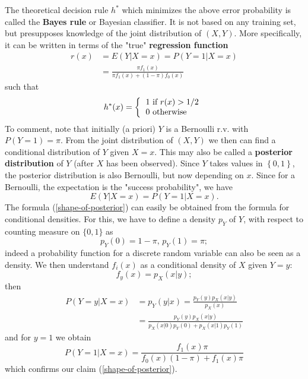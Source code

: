 \documentclass[11pt,twoside]{article}%
\theoremstyle{change}
\begin{document}
The theoretical decision rule $h^{\ast}$ which minimizes the above error
probability is called the \textbf{Bayes rule} or Bayesian classifier. It is
not based on any training set, but presupposes knowledge of the joint
distribution of $\left(  X,Y\right)  $. More specifically, it can be written
in terms of the "true" \textbf{regression function}
\begin{align}
r(x)  & =E\left(  Y|X=x\right)  =P\left(  Y=1|X=x\right) \\
& =\frac{\pi f_{1}(x)}{\pi f_{1}(x)+\left(  1-\pi\right)  f_{0}(x)}%
\label{shape-of-posterior}%
\end{align}
such that
\begin{equation}
h^{\ast}(x)=\left\{
\begin{tabular}
[c]{l}%
$1$ if $r(x)>1/2$\\
$0$ otherwise
\end{tabular}
\right. \label{bayes-rule-def}%
\end{equation}
To comment, note that initially (a priori) $Y$ is a Bernoulli r.v. with
$P\left(  Y=1\right)  =\pi$. From the joint distribution of $(X,Y)$ we then
can find a conditional distribution of $Y$ given $X=x$. This may also be
called a \textbf{posterior distribution} of $Y$ (after $X$ has been observed).
Since $Y$ takes values in $\left\{  0,1\right\}  $, the posterior distribution
is also Bernoulli, but now depending on $x$. Since for a Bernoulli, the
expectation is the "success probability", we have
\[
E\left(  Y|X=x\right)  =P\left(  Y=1|X=x\right)  .
\]
The formula (\ref{shape-of-posterior}) can easily be obtained from the formula
for conditional densities. For this, we have to define a density $p_{Y}$ of
$Y$, with respect to counting measure on $\{0,1\}$ as
\[
p_{Y}(0)=1-\pi\text{, }p_{Y}(1)=\pi;
\]
indeed a probability function for a discrete random variable can also be seen
as a density. We then understand $f_{i}(x)$ as a conditional density of $X$
given $Y=y$:%
\[
f_{y}(x)=p_{X}(x|y);
\]
then
\begin{align*}
P\left(  Y=y|X=x\right)   & =p_{Y}(y|x)=\frac{p_{Y}(y)p_{X}(x|y)}{p_{X}(x)}\\
& =\frac{p_{Y}(y)p_{X}(x|y)}{p_{X}(x|0)p_{Y}(0)+p_{X}(x|1)p_{Y}(1)}%
\end{align*}
and for $y=1$ we obtain
\[
P\left(  Y=1|X=x\right)  =\frac{f_{1}(x)\pi}{f_{0}(x)\left(  1-\pi\right)
+f_{1}(x)\pi}%
\]
which confirms our claim (\ref{shape-of-posterior}).
\end{document}
